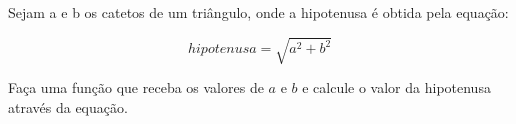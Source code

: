 
\question[10]

Sejam a e b os catetos de um triângulo, onde a hipotenusa é obtida pela equação: 

\begin{equation*}
	hipotenusa=\sqrt{a^2 + b^2}
\end{equation*}

Faça uma função que receba os valores de $a$ e $b$ e calcule o valor da hipotenusa através da equação.


